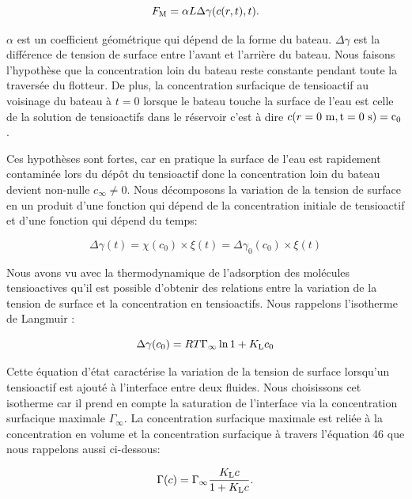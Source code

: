 \documentclass[french, 10pt]{article}
\begin{document}
 \begin{equation}
   F_{\rm M} = \alpha L\Delta\gamma(c(r,t),t). 
 \end{equation}
 
 $\alpha$ est un coefficient géométrique qui dépend de la forme du bateau. $\Delta\gamma$ est la différence de tension de surface entre l'avant et l'arrière du bateau. Nous faisons l'hypothèse que la concentration loin du bateau reste constante pendant toute la traversée du flotteur. De plus, la concentration surfacique de tensioactif au voisinage du bateau à $t=0$ lorsque le bateau touche la surface de l'eau est celle de la solution de tensioactifs dans le réservoir c'est à dire $c(r=0~\rm m,t=0~\rm s) = c_0$.\bigskip

 Ces hypothèses sont fortes, car en pratique la surface de l'eau est rapidement contaminée lors du dépôt du tensioactif donc la concentration loin du bateau devient non-nulle $c_{\infty} \neq 0$. Nous décomposons la variation de la tension de surface en un produit d'une fonction qui dépend de la concentration initiale de tensioactif et d'une fonction qui dépend du temps:

\begin{equation}
  \Delta\gamma(t) = \chi(c_0)\times \xi(t) = \Delta\gamma_0(c_0)\times \xi(t)
\end{equation}

Nous avons vu avec la thermodynamique de l'adsorption des molécules tensioactives qu'il est possible d'obtenir des relations entre la variation de la tension de surface et la concentration en tensioactifs. Nous rappelons l'isotherme de Langmuir : 

\begin{equation}
  \Delta\gamma(c_0) = RT\Gamma_{\infty}\ln{1+K_{\rm L}c_0}
\end{equation}

Cette équation d'état caractérise la variation de la tension de surface lorsqu'un tensioactif est ajouté à l'interface entre deux fluides. Nous choisissons cet isotherme car il prend en compte la saturation de l'interface via la concentration surfacique maximale $\Gamma_{\infty}$. La concentration surfacique maximale est reliée à la concentration en volume et la concentration surfacique à travers l'équation 46 que nous rappelons aussi ci-dessous:

\begin{equation}
  \Gamma(c) = \Gamma_{\infty}\frac{K_{\rm L}c}{1+K_{\rm L}c}.
\end{equation}
\end{document}
